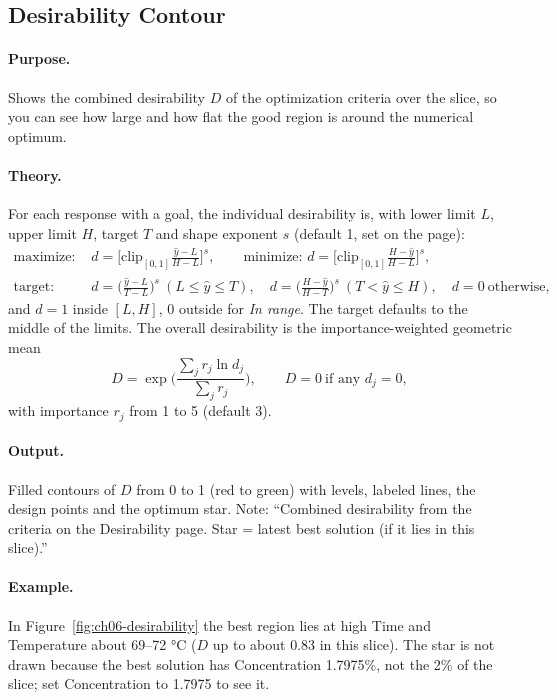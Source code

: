 \subsection{Desirability Contour}\label{sec:ch06-desirability}
\paragraph{Purpose.} Shows the combined desirability $D$ of the optimization criteria over the slice, so you
can see how large and how flat the good region is around the numerical optimum.
\paragraph{Theory.} For each response with a goal, the individual desirability \citep{derringer1980} is, with
lower limit $L$, upper limit $H$, target $T$ and shape exponent $s$ (default 1, set on the
 page):
\begin{align}
  \text{maximize: }& d=\Big[\text{clip}_{[0,1]}\frac{\hat y-L}{H-L}\Big]^{s},\qquad
  \text{minimize: } d=\Big[\text{clip}_{[0,1]}\frac{H-\hat y}{H-L}\Big]^{s}, \label{eq:ch06-dmax}\\
  \text{target: }& d=\Big(\frac{\hat y-L}{T-L}\Big)^{s}\ (L\le\hat y\le T),\quad
  d=\Big(\frac{H-\hat y}{H-T}\Big)^{s}\ (T<\hat y\le H),\quad d=0\ \text{otherwise}, \label{eq:ch06-dtarget}
\end{align}
and $d=1$ inside $[L,H]$, 0 outside for \emph{In range}. The target defaults to the middle of the limits.
The overall desirability is the importance-weighted geometric mean
\begin{equation}
  D=\exp\Big(\frac{\sum_j r_j\ln d_j}{\sum_j r_j}\Big),\qquad D=0\ \text{if any } d_j=0,
  \label{eq:ch06-D}
\end{equation}
with importance $r_j$ from 1 to 5 (default 3).
\paragraph{Output.} Filled contours of $D$ from 0 to 1 (red to green) with  levels,
labeled lines, the design points and the optimum star. Note: ``Combined desirability from the criteria on
the Desirability page. Star = latest best solution (if it lies in this slice).''
\paragraph{Example.} In Figure~\ref{fig:ch06-desirability} the best region lies at high Time and
Temperature about 69--72 °C ($D$ up to about 0.83 in this slice). The star is not drawn because the best
solution has Concentration 1.7975\%, not the 2\% of the slice; set Concentration to 1.7975 to see it.

